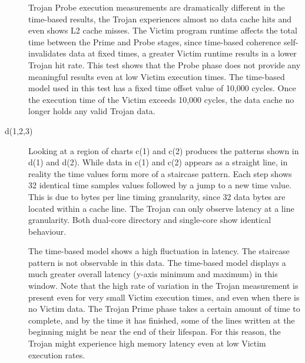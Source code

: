 \begin{description}
						Trojan Probe execution measurements are dramatically different in the time-based results, the Trojan experiences almost no data cache hits and even shows L2 cache misses. The Victim program runtime affects the total time between the Prime and Probe stages, since time-based coherence self-invalidates data at fixed times, a greater Victim runtime results in a lower Trojan hit rate. This test shows that the Probe phase does not provide any meaningful results even at low Victim execution times. The time-based model used in this test has a fixed time offset value of 10,000 cycles. Once the execution time of the Victim exceeds 10,000 cycles, the data cache no longer holds any valid Trojan data. 
					\item [d(1,2,3)] 
						Looking at a region of charts c(1) and c(2) produces the patterns shown in d(1) and d(2). While data in c(1) and c(2) appears as a straight line, in reality the time values form more of a staircase pattern. Each step shows 32 identical time samples values followed by a jump to a new time value. This is due to bytes per line timing granularity, since 32 data bytes are located within a cache line. The Trojan can only observe latency at a line granularity. Both dual-core directory and single-core show identical behaviour.
						
						The time-based model shows a high fluctuation in latency. The staircase pattern is not observable in this data. The time-based model displays a much greater overall latency (y-axis minimum and maximum) in this window. Note that the high rate of variation in the Trojan measurement is present even for very small Victim execution times, and even when there is no Victim data. The Trojan Prime phase takes a certain amount of time to complete, and by the time it has finished, some of the lines written at the beginning might be near the end of their lifespan. For this reason, the Trojan might experience high memory latency even at low Victim execution rates.
					\end{description}
				
